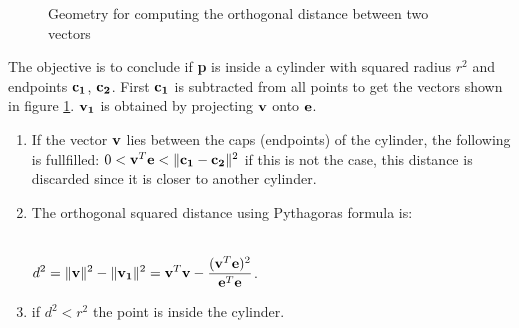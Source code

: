 \begin{figure}[H]
\caption{Geometry for computing the orthogonal distance between two vectors}
\label{geometry}
\end{figure}
\vspace{20 pt}

The objective is to conclude if {\bf p} is inside a cylinder with squared radius $r^2$ and endpoints ${\bf c_1}$, ${\bf c_2}$. First ${\bf c_1}$ is subtracted from all points to get the vectors shown in figure \ref{geometry}. $\bf v_1$ is obtained by projecting $\bf v$ onto $\bf e$.

\begin{enumerate}
\item If the vector $\bf v$ lies between the caps (endpoints) of the cylinder, the following is fullfilled: $ 0 < {\bf v}^T{\bf e} < \| {\bf c_1}-{\bf c_2}\|^2$ if this is not the case, this distance is discarded since it is closer to another cylinder. 

\item The orthogonal squared distance using Pythagoras formula is:\\\\
\begin{center}
$\displaystyle d^2 = \|{\bf v}\|^2 - \|{\bf v_1}\|^2= {\bf v}^T{\bf v} -\frac{({\bf v}^T{\bf e})^2}{{\bf e}^T {\bf e}}$. 
\end{center}


\item if $d^2 < r^2$ the point is inside the cylinder.
\end{enumerate}

